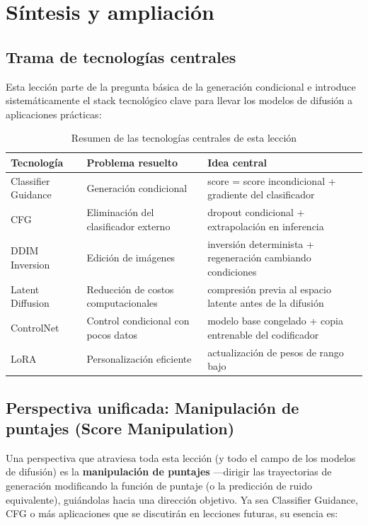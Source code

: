 \section{Síntesis y ampliación}

\subsection{Trama de tecnologías centrales}

Esta lección parte de la pregunta básica de la generación condicional e introduce sistemáticamente el stack tecnológico clave para llevar los modelos de difusión a aplicaciones prácticas:

\begin{table}[H]
\centering
\begin{tabular}{lp{4.5cm}p{4.5cm}}
\toprule
\textbf{Tecnología} & \textbf{Problema resuelto} & \textbf{Idea central} \\
\midrule
Classifier Guidance & Generación condicional & score = score incondicional + gradiente del clasificador \\
CFG & Eliminación del clasificador externo & dropout condicional + extrapolación en inferencia \\
DDIM Inversion & Edición de imágenes & inversión determinista + regeneración cambiando condiciones \\
Latent Diffusion & Reducción de costos computacionales & compresión previa al espacio latente antes de la difusión \\
ControlNet & Control condicional con pocos datos & modelo base congelado + copia entrenable del codificador \\
LoRA & Personalización eficiente & actualización de pesos de rango bajo \\
\bottomrule
\end{tabular}
\caption{Resumen de las tecnologías centrales de esta lección}
\end{table}

\subsection{Perspectiva unificada: Manipulación de puntajes (Score Manipulation)}

Una perspectiva que atraviesa toda esta lección (y todo el campo de los modelos de difusión) es la \textbf{manipulación de puntajes} —dirigir las trayectorias de generación modificando la función de puntaje (o la predicción de ruido equivalente), guiándolas hacia una dirección objetivo. Ya sea Classifier Guidance, CFG o más aplicaciones que se discutirán en lecciones futuras, su esencia es:

